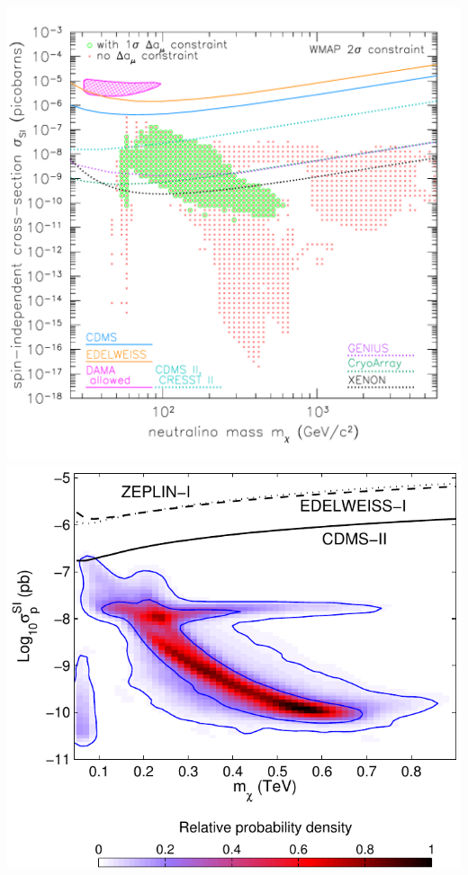 \documentclass[xcolor=dvipsnames]{beamer}
\begin{document}
\begin{frame}
\begin{columns}
\includegraphics[width=\textwidth]{sigsi}
\includegraphics[width=\textwidth]{Ruiz06}
\end{columns}

\end{frame}
\end{document}
